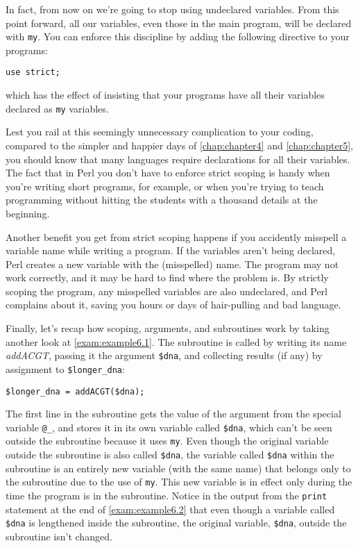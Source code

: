 In fact, from now on we're going to stop using undeclared variables. From this point forward, all our variables, even those in the main program, will be declared with \verb|my|. You can enforce this discipline by adding the following directive to your programs:

\begin{lstlisting}
use strict;
\end{lstlisting}

which has the effect of insisting that your programs have all their variables declared as \verb|my| variables.

Lest you rail at this seemingly unnecessary complication to your coding, compared to the simpler and happier days of \autoref{chap:chapter4} and \autoref{chap:chapter5}, you should know that many languages require declarations for all their variables. The fact that in Perl you don't have to enforce strict scoping is handy when you're writing short programs, for example, or when you're trying to teach programming without hitting the students with a thousand details at the beginning.

Another benefit you get from strict scoping happens if you accidently misspell a variable name while writing a program. If the variables aren't being declared, Perl creates a new variable with the (misspelled) name. The program may not work correctly, and it may be hard to find where the problem is. By strictly scoping the program, any misspelled variables are also undeclared, and Perl complains about it, saving you hours or days of hair-pulling and bad language.

Finally, let's recap how scoping, arguments, and subroutines work by taking another look at \autoref{exam:example6.1}. The subroutine is called by writing its name \textit{addACGT}, passing it the argument \verb|$dna|, and collecting results (if any) by assignment to \verb|$longer_dna|:

\begin{lstlisting}
$longer_dna = addACGT($dna); 
\end{lstlisting}

The first line in the subroutine gets the value of the argument from the special variable \verb|@_|, and stores it in its own variable called \verb|$dna|, which can't be seen outside the subroutine because it uses \verb|my|. Even though the original variable outside the subroutine is also called \verb|$dna|, the variable called \verb|$dna| within the subroutine is an entirely new variable (with the same name) that belongs only to the subroutine due to the use of \verb|my|. This new variable is in effect only during the time the program is in the subroutine. Notice in the output from the \verb|print| statement at the end of \autoref{exam:example6.2} that even though a variable called \verb|$dna| is lengthened inside the subroutine, the original variable, \verb|$dna|, outside the subroutine isn't changed. 

